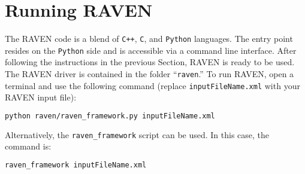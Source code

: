 
\section{Running RAVEN}
\label{HowToRun}

The RAVEN code is a blend of \texttt{C++}, \texttt{C}, and \texttt{Python} languages. The entry point
resides on the \texttt{Python} side and is accessible via a command line interface.
%
After following the instructions in the previous Section, RAVEN is ready to be
used.
%
The RAVEN driver is contained in the folder ``\texttt{raven}.''
%
To run RAVEN, open a terminal and use the following command (replace \texttt{inputFileName.xml} with your RAVEN input file):

\begin{lstlisting}[language=bash]
python raven/raven_framework.py inputFileName.xml
\end{lstlisting}

Alternatively, the \texttt{raven\_framework} script can be used.  In this case, the command is:

\begin{lstlisting}[language=bash]
raven_framework inputFileName.xml
\end{lstlisting}

